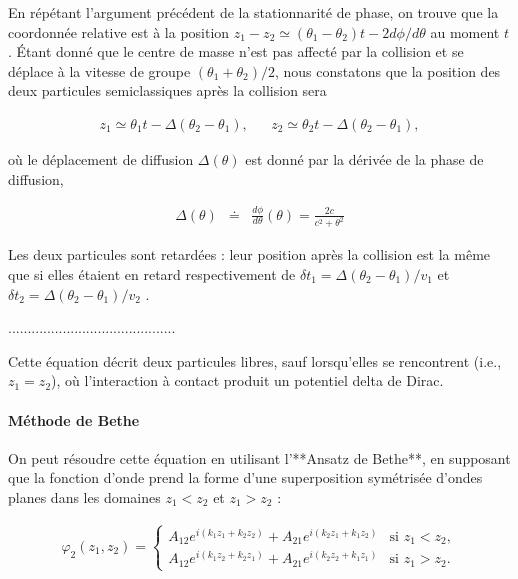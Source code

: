 En répétant l'argument précédent de la stationnarité de phase, on trouve que la coordonnée relative est à la position $z_1 - z_2 \simeq (\theta_1 - \theta_2)t - 2d\phi /d\theta$ au moment $t$. Étant donné que le centre de masse n'est pas affecté par la collision et se déplace à la vitesse de groupe $(\theta_1 + \theta_2)/2$, nous constatons que la position des deux particules semiclassiques après la collision sera

\begin{eqnarray}
	z_1 \simeq \theta _1 t - \Delta ( \theta_2 -\theta_1 ), & &	z_2 \simeq \theta _2 t - \Delta ( \theta_2 -\theta_1 ),
\end{eqnarray}

où le déplacement de diffusion $\Delta (\theta)$ est donné par la dérivée de la phase de diffusion,

\begin{eqnarray}\label{eq:I-1-16}
	\Delta ( \theta ) & \doteq & \frac{ d \phi }{ d \theta } ( \theta )= \frac{ 2 c }{ c^2 + \theta^2}  	
\end{eqnarray}

Les deux particules sont retardées : leur position après la collision est la même que si elles étaient en retard respectivement de $\delta t_1 = \Delta ( \theta_2 - \theta_1 )/v_1 $ et $\delta t_2 = \Delta ( \theta_2 - \theta_1 )/v_2 $ .

...........................................

Cette équation décrit deux particules libres, sauf lorsqu'elles se rencontrent (i.e., \(z_1 = z_2\)), où l'interaction à contact produit un potentiel delta de Dirac.

\paragraph{Méthode de Bethe}

On peut résoudre cette équation en utilisant l’**Ansatz de Bethe**, en supposant que la fonction d’onde prend la forme d’une superposition symétrisée d’ondes planes dans les domaines \(z_1 < z_2\) et \(z_1 > z_2\) :

\begin{eqnarray}
	\varphi_2(z_1, z_2) = \begin{cases}
		A_{12} e^{i(k_1 z_1 + k_2 z_2)} + A_{21} e^{i(k_2 z_1 + k_1 z_2)} & \text{si } z_1 < z_2, \\
		A_{12} e^{i(k_1 z_2 + k_2 z_1)} + A_{21} e^{i(k_2 z_2 + k_1 z_1)} & \text{si } z_1 > z_2.
	\end{cases}
\end{eqnarray}

